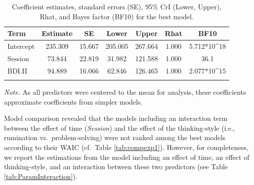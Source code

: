 \documentclass[a4paper,12pt,twoside,openright,oldfontcommands,final]{memoir}
\begin{document}
\begin{table}[H]
\begin{center}
\begin{threeparttable}
\caption{\label{tab:paramexp1}Coefficient estimates, standard errors (SE), 95\% CrI (Lower, Upper), Rhat, and Bayes factor (BF10) for the best model.}
\small{
\begin{tabular}{lcccccc}
\toprule
Term & \multicolumn{1}{c}{Estimate} & \multicolumn{1}{c}{SE} & \multicolumn{1}{c}{Lower} & \multicolumn{1}{c}{Upper} & \multicolumn{1}{c}{Rhat} & \multicolumn{1}{c}{BF10}\\
\midrule
Intercept & 235.309 & 15.667 & 205.005 & 267.664 & 1.000 & 5.712*10\textasciicircum{}18\\
Session & 73.844 & 22.819 & 31.982 & 121.588 & 1.000 & 36.1\\
BDI.II & 94.889 & 16.066 & 62.846 & 126.465 & 1.000 & 2.077*10\textasciicircum{}15\\
\bottomrule
\addlinespace
\end{tabular}
}
\begin{tablenotes}[para]
\textit{Note.} As all predictors were centered to the mean for analysis, these coefficients approximate coefficients from simpler models.
\end{tablenotes}
\end{threeparttable}
\end{center}
\end{table}

Model comparison revealed that the models including an interaction term between the effect of time (\emph{Session}) and the effect of the thinking-style (i.e., rumination vs.~problem-solving) were not ranked among the best models according to their WAIC (cf.~Table \ref{tab:compexp1}). However, for completeness, we report the estimations from the model including an effect of time, an effect of thinking-style, and an interaction between these two predictors (see Table \ref{tab:ParamInteraction}).
\end{document}
